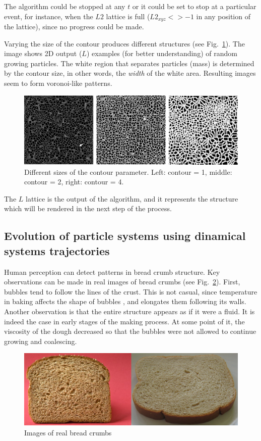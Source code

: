 \documentclass[oneside,a4paper,english,links]{amca}
\begin{document}
The algorithm could be stopped at any $t$ or it could be set to stop at a particular event, for instance, when the $L2$ lattice is full ($L2_{xyz} <> -1$ in any position of the lattice), since no progress could be made.

Varying the size of the contour produces different structures (see Fig.~\ref{fg:fig1}). The image shows 2D output ($L$) examples (for better understanding) of random growing particles. The white region that separates particles (mass) is determined by the contour size, in other words, the {\em width} of the white area. Resulting images seem to form voronoi-like patterns.


\begin{figure}[htb!]
  \centerline{\includegraphics[scale=0.22]{fig1.pdf}}
  \caption{Different sizes of the contour parameter. Left: contour = 1, middle: contour = 2, right: contour = 4.}
  \label{fg:fig1}
\end{figure}

The $L$ lattice is the output of the algorithm, and it represents the structure which will be rendered in the next step of the process.

\subsection{Evolution of particle systems using dinamical systems trajectories}

Human perception can detect patterns in bread crumb structure. Key observations can be made in real images of bread crumbs (see Fig.~\ref{fg:fig2}). First, bubbles tend to follow the lines of the crust. This is not casual, since temperature in baking affects the shape of bubbles \citep{Scanlon2001}, and elongates them following its walls. Another observation is that the entire structure appears as if it were a fluid. It is indeed the case in early stages of the making process. At some point of it, the viscosity of the dough decreased so that the bubbles were not allowed to continue growing and coalescing.

\begin{figure}[htb!]
  \centerline{\includegraphics[scale=0.45]{fig2}}
  \caption{Images of real bread crumbs}
  \label{fg:fig2}
\end{figure}
\end{document}

